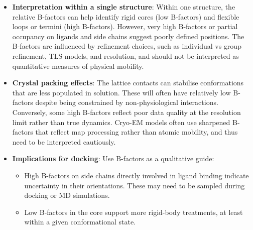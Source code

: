 \documentclass[12pt]{article}
\begin{document}
\begin{itemize}
For docking at interfaces, it is always recommended to construct the predicted biological assembly, rather than using the ASU by default.

\subsection{Understanding B-factors and Crystal Packing Effects on Dynamics}
B-factors (atomic displacement parameters) quantify the mean-square displacement of atoms from their average positions in the model. They reflect a combination of physical motion, static disorder, and model uncertainty.

\item \textbf{Interpretation within a single structure}: Within one structure,  the relative B-factors can help identify rigid cores (low B-factors) and flexible loops or termini (high B-factors). However, very high B-factors or partial occupancy on ligands and side chains suggest poorly defined positions. The B-factors are influenced by refinement choices, such as individual vs group refinement, TLS models, and resolution, and should not be interpreted as quantitative measures of physical mobility.\cite{CH4_Wang2015_structure_quality,CH4_shao2017multivariate}

\item \textbf{Crystal packing effects}: The lattice contacts can stabilise conformations that are less populated in solution.  These will often have relatively low B-factors despite being constrained by non-physiological interactions. Conversely, some high B-factors reflect poor data quality at the resolution limit rather than true dynamics.\cite{CH4_Evans2013_data_quality,CH4_Joosten2009_PDB_related_databanks} Cryo-EM models often use sharpened B-factors that reflect map processing rather than atomic mobility, and thus need to be interpreted cautiously.\cite{CH4_pintilie2021validation}


\item \textbf{Implications for docking}: Use B-factors as a qualitative guide:

\begin{itemize}
  \item High B-factors on side chains directly involved in ligand binding indicate uncertainty in their orientations. These may need to be sampled during docking or MD simulations.
  \item Low B-factors in the core support more rigid-body treatments, at least within a given conformational state.
\end{itemize}
\end{itemize}
\end{document}
